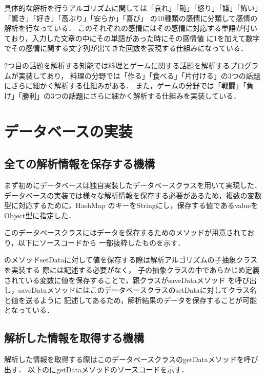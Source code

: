 具体的な解析を行うアルゴリズムに関しては「哀れ」「恥」「怒り」「嫌」「怖い」「驚き」「好き」「高ぶり」「安らか」「喜び」
の10種類の感情に分類して感情の解析を行なっている．
このそれぞれの感情にはその感情に対応する単語が付いており，入力した文章の中にその単語があった時にその感情値
に1を加えて数字でその感情に関する文字列が出てきた回数を表現する仕組みになっている．

2つ目の話題を解析する知能では料理とゲームに関する話題を解析するプログラムが実装してあり，
料理の分野では「作る」「食べる」「片付ける」の3つの話題にさらに細かく解析する仕組みがある．
また，ゲームの分野では「戦闘」「負け」「勝利」の3つの話題にさらに細かく解析する仕組みを実装している．


\section{データベースの実装}
\subsection{全ての解析情報を保存する機構}
まず初めにデータベースは独自実装したデータベースクラスを用いて実現した．
データベースの実装では様々な解析情報を保存する必要があるため，複数の変数型に対応するために，HashMap
のキーをStringにし，保存する値であるvalueをObject型に指定した．

このデータベースクラスにはデータを保存するためのメソッドが用意されており，以下にソースコードから
一部抜粋したものを示す．


のメソッドsetDataに対して値を保存する際は解析アルゴリズムの子抽象クラスを実装する
際には記述する必要がなく，
子の抽象クラスの中であらかじめ定義されている変数に値を保存することで，親クラスがsaveDataメソッド
を呼び出し，saveDataメソッドにはこのデータベースクラスのsetDataに対してクラス名と値を送るように
記述してあるため，解析結果のデータを保存することが可能となっている．

\subsection{解析した情報を取得する機構}
解析した情報を取得する際はこのデータベースクラスのgetDataメソッドを呼び出す．
以下のにgetDataメソッドのソースコードを示す．

